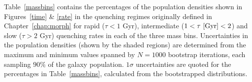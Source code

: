 Table~\ref{massbins} contains the percentages of the population densities shown in Figures~\ref{time} \& \ref{rate} in the quenching regimes originally defined in Chapter~\ref{chap:morph} for rapid ($\tau < 1$ Gyr), intermediate ($1 < \tau ~\rm{[Gyr]} < 2$) and slow ($\tau > 2$ Gyr) quenching rates in each of the three mass bins. Uncertainties in the population densities (shown by the shaded regions) are determined from the maximum and minimum values spanned by $N = 1000$ bootstrap iterations, each sampling $90\%$ of the galaxy population. $1\sigma$ uncertainties are quoted for the percentages in Table~\ref{massbins}, calculated from the bootstrapped distributions.


\begin{table}
{\tiny
{}}
\end{table}

